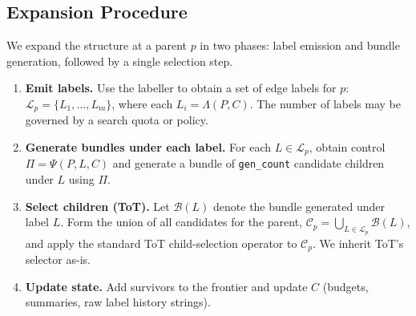 \documentclass{article}
\theoremstyle{plain}
\theoremstyle{definition}
\theoremstyle{remark}
\begin{document}
\subsection{Expansion Procedure}
We expand the structure at a parent $p$ in two phases: label emission and bundle generation, followed by a single selection step.
\begin{enumerate}
  \item \textbf{Emit labels.} Use the labeller to obtain a set of edge labels for $p$:
  $\mathcal{L}_p = \{L_1,\dots,L_m\}$, where each $L_i=\Lambda(P,C)$. The number of labels may be governed by a search quota or policy.
  \item \textbf{Generate bundles under each label.} For each $L\in\mathcal{L}_p$, obtain control $\Pi=\Psi(P,L,C)$ and generate a bundle of \texttt{gen\_count} candidate children under $L$ using $\Pi$.
  \item \textbf{Select children (ToT).} Let $\mathcal{B}(L)$ denote the bundle generated under label $L$. Form the union of all candidates for the parent, $\mathcal{C}_p=\bigcup_{L\in\mathcal{L}_p}\mathcal{B}(L)$, and apply the standard ToT child-selection operator to $\mathcal{C}_p$. We inherit ToT's selector as-is.
  \item \textbf{Update state.} Add survivors to the frontier and update $C$ (budgets, summaries, raw label history strings).
\end{enumerate}
\end{document}

